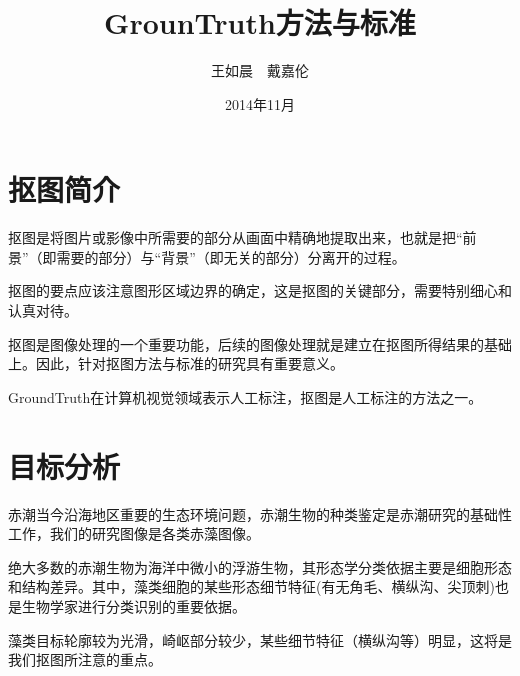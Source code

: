 \documentclass[12pt]{article}
\begin{document}
\title{\vspace{-2em}GrounTruth方法与标准\vspace{-0.7em}}
\author{王如晨　戴嘉伦}
\date{\vspace{-0.7em}2014年11月\vspace{-0.7em}}
\maketitle\thispagestyle{fancy}

\section{抠图简介}
\begin{enumerate*}
\item 抠图是将图片或影像中所需要的部分从画面中精确地提取出来，也就是把“前景”（即需要的部分）与“背景”（即无关的部分）分离开的过程。
\item 抠图的要点应该注意图形区域边界的确定，这是抠图的关键部分，需要特别细心和认真对待。
\item 抠图是图像处理的一个重要功能，后续的图像处理就是建立在抠图所得结果的基础上。因此，针对抠图方法与标准的研究具有重要意义。
\item GroundTruth在计算机视觉领域表示人工标注，抠图是人工标注的方法之一。
\end{enumerate*}



\section{目标分析}
\begin{itemize*}
\item 赤潮当今沿海地区重要的生态环境问题，赤潮生物的种类鉴定是赤潮研究的基础性工作，我们的研究图像是各类赤藻图像。
\item 绝大多数的赤潮生物为海洋中微小的浮游生物，其形态学分类依据主要是细胞形态和结构差异。其中，藻类细胞的某些形态细节特征(有无角毛、横纵沟、尖顶刺)也是生物学家进行分类识别的重要依据。
\item 藻类目标轮廓较为光滑，崎岖部分较少，某些细节特征（横纵沟等）明显，这将是我们抠图所注意的重点。
\end{itemize*}
\end{document}
